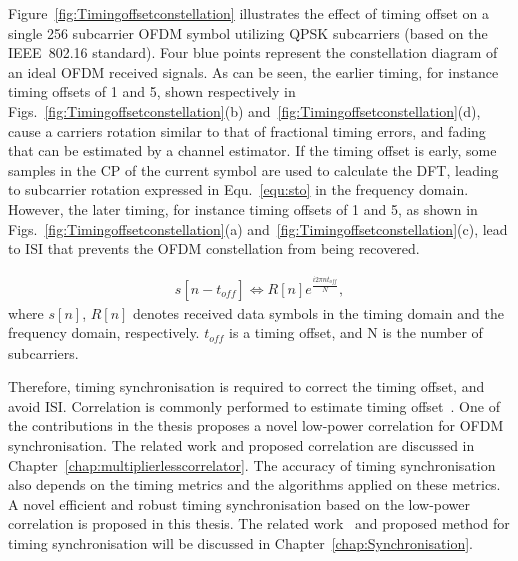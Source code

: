 Figure~\ref{fig:Timingoffsetconstellation} illustrates the effect of timing offset on a single 256 subcarrier OFDM symbol utilizing QPSK subcarriers (based on the IEEE~802.16 standard).
Four blue points represent the constellation diagram of an ideal OFDM received signals.
As can be seen, the earlier timing, for instance timing offsets of 1 and 5, shown respectively in Figs.~\ref{fig:Timingoffsetconstellation}(b) and~\ref{fig:Timingoffsetconstellation}(d), cause a carriers rotation similar to that of fractional timing errors, and fading that can be estimated by a channel estimator.
If the timing offset is early, some samples in the CP of the current symbol are used to calculate the DFT, leading to subcarrier rotation expressed in Equ.~\ref{equ:sto} in the frequency domain.
However, the later timing, for instance timing offsets of 1 and 5, as shown in Figs.~\ref{fig:Timingoffsetconstellation}(a) and~\ref{fig:Timingoffsetconstellation}(c), lead to ISI that prevents the OFDM constellation from being recovered.

\begin{eqnarray}
\label{equ:sto}
              s[n - t_{\mathit{off}}]  \Leftrightarrow R[n] e^{\frac{i2\pi n t_{\mathit{off}}}{N}},
\end{eqnarray}
where $s[n]$, $R[n]$ denotes received data symbols in the timing domain and the frequency domain, respectively. $t_{\mathit{off}}$ is a timing offset, and N is the number of subcarriers.

Therefore, timing synchronisation is required to correct the timing offset, and avoid ISI.
Correlation is commonly performed to estimate timing offset~\cite{Dick2003,Fort2003,Wang2004}. One of the contributions in the thesis proposes a novel low-power correlation for OFDM synchronisation. The related work and proposed correlation are discussed in Chapter~\ref{chap:multiplierlesscorrelator}.
The accuracy of timing synchronisation also depends on the timing metrics and the algorithms applied on these metrics. A novel efficient and robust timing synchronisation based on the low-power correlation is proposed in this thesis. The related work~\cite{Schmidl1997,Kishore2006,Guffey2007,Huang2010,Recio2010} and proposed method for timing synchronisation will be discussed in Chapter~\ref{chap:Synchronisation}.
